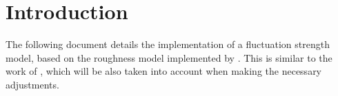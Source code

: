 \documentclass[a4paper]{article}
\begin{document}

\section{Introduction}

The following document details the implementation of a fluctuation strength
model, based on the roughness model implemented by \citeauthor{Schrader2002}.
This is similar to the work of \citeauthor{Sontacchi1998}, which will be also
taken into account when making the necessary adjustments.



\end{document}
